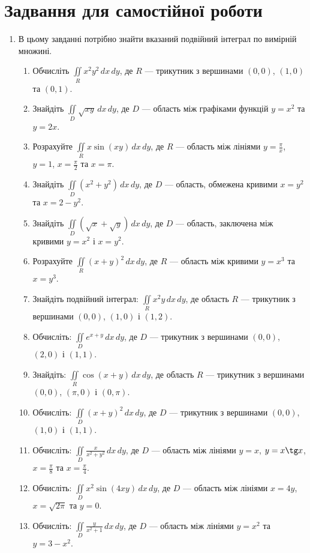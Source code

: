 \chapter{Задвання для самостійної роботи}
\begin{enumerate}
\item  В цьому завданні потрібно знайти вказаний подвійний інтеграл по вимірній множині.
\begin{enumerate}[label*=\arabic*.]
\item Обчисліть ${{\iint\limits_R x^2y^2 \,dx\,dy}}$, де ${{R}}$ --- трикутник з вершинами ${(0,0)}$, ${(1,0)}$ та ${(0,1)}$.
\item Знайдіть ${\iint\limits_D \sqrt{xy} \,dx\,dy}$, де ${D}$ --- область між графіками функцій ${y = x^2}$ та ${y = 2x}$.
\item Розрахуйте ${\iint\limits_R x\sin(xy) \,dx\,dy}$, де ${R}$ --- область між лініями ${y = \frac{\pi}{x}}$, ${y = 1}$, ${x = \frac{\pi}{2}}$ та ${x = \pi}$.
\item Знайдіть ${\iint\limits_D (x^2 + y^2) \,dx\,dy}$, де ${D}$ --- область, обмежена кривими ${x = y^2}$ та ${x = 2-y^2}$.
\item Знайдіть ${\iint\limits_D \left(\sqrt{x} + \sqrt{y}\right) \,dx\,dy}$, де ${D}$ --- область, заключена між кривими ${y = x^2}$ і ${x = y^2}$.
\item Розрахуйте ${\iint\limits_R  (x +y)^{2} \,dx\,dy}$, де ${R}$ --- область між кривими ${y = x^3}$ та ${x = y^3}$.
  \item Знайдіть подвійний інтеграл: $\iint\limits_R x^2y\,dx\,dy$, де область $R$ --- трикутник з вершинами $(0,0)$, $(1,0)$ і $(1,2)$.
  \item Обчисліть: $\iint\limits_D e^{x+y}\,dx\,dy$, де $D$ --- трикутник з вершинами $(0,0)$, $(2,0)$ і $(1,1)$.
  \item Знайдіть: $\iint\limits_R \cos(x+y)\,dx\,dy$, де область $R$ --- трикутник з вершинами $(0,0)$, $(\pi,0)$ і $(0,\pi)$.
  \item Обчисліть: $\iint\limits_D (x+y)^2\,dx\,dy$, де $D$ --- трикутник з вершинами $(0,0)$, $(1,0)$ і $(1,1)$.
  \item Обчисліть: $\iint\limits_D \frac{x}{x^2+y^2}\,dx\,dy$, де $D$ --- область між лініями ${y = x}$, ${y = x\tg x}$, ${x = \frac{\pi}{8}}$ та ${x = \frac{\pi}{4}}$.
  \item Обчисліть: $\iint\limits_D x^2\sin(4 x y)\,dx\,dy$, де $D$ --- область між лініями ${x = 4y}$, ${x = \sqrt{2\pi}}$ та ${y = 0}$.
  \item Обчисліть: $\iint\limits_D \frac{y}{x^2 + 1}\,dx\,dy$, де $D$ --- область між лініями ${y = x^2}$ та ${y = 3 - x^2}$.

\end{enumerate}
\end{enumerate}
